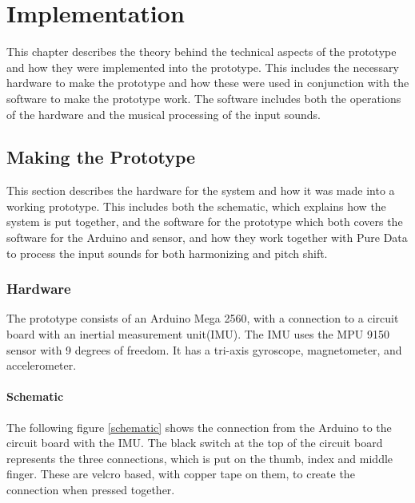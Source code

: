 \chapter{Implementation}

This chapter describes the theory behind the technical aspects of the prototype and how they were implemented into the prototype. This includes the necessary hardware to make the prototype and how these were used in conjunction with the software to make the prototype work. The software includes both the operations of the hardware and the musical processing of the input sounds.

\section{Making the Prototype}

This section describes the hardware for the system and how it was made into a working prototype. This includes both the schematic, which explains how the system is put together, and the software for the prototype which both covers the software for the Arduino and sensor, and how they work together with Pure Data to process the input sounds for both harmonizing and pitch shift.

\subsection{Hardware}

The prototype consists of an Arduino Mega 2560\citep{Arduino}, with a connection to a circuit board with an inertial measurement unit(IMU). 
The IMU uses the MPU 9150 sensor with 9 degrees of freedom\citep{MPU}. It has a tri-axis gyroscope, magnetometer, and accelerometer.
\subsubsection{Schematic}

The following figure \ref{schematic} shows the connection from the Arduino to the circuit board with the IMU. The black switch at the top of the circuit board
represents the three connections, which is put on the thumb, index and middle finger. These are velcro based, with copper tape on them, to create the connection when pressed together. \\

\begin{minipage}{\linewidth}%
\label{schematic}
\end{minipage}\\

